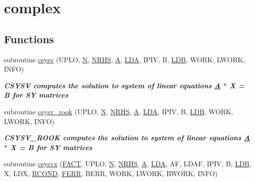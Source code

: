 \hypertarget{group__complexSYsolve}{}\section{complex}
\label{group__complexSYsolve}
\subsection*{Functions}
\begin{DoxyCompactItemize}
\item 
subroutine \hyperlink{group__complexSYsolve_ga7bfdf654eb5b41b318d5b8b3be55f575}{csysv} (U\+P\+L\+O, \hyperlink{polmisc_8c_a0240ac851181b84ac374872dc5434ee4}{N}, \hyperlink{example__user_8c_aa0138da002ce2a90360df2f521eb3198}{N\+R\+H\+S}, \hyperlink{classA}{A}, \hyperlink{example__user_8c_ae946da542ce0db94dced19b2ecefd1aa}{L\+D\+A}, I\+P\+I\+V, B, \hyperlink{example__user_8c_a50e90a7104df172b5a89a06c47fcca04}{L\+D\+B}, W\+O\+R\+K, L\+W\+O\+R\+K, I\+N\+F\+O)
\begin{DoxyCompactList}\small\item\em {\bfseries  C\+S\+Y\+S\+V computes the solution to system of linear equations \hyperlink{classA}{A} $\ast$ X = B for S\+Y matrices} \end{DoxyCompactList}\item 
subroutine \hyperlink{group__complexSYsolve_gaadb410c9b1f28931fe04501234603985}{csysv\+\_\+rook} (U\+P\+L\+O, \hyperlink{polmisc_8c_a0240ac851181b84ac374872dc5434ee4}{N}, \hyperlink{example__user_8c_aa0138da002ce2a90360df2f521eb3198}{N\+R\+H\+S}, \hyperlink{classA}{A}, \hyperlink{example__user_8c_ae946da542ce0db94dced19b2ecefd1aa}{L\+D\+A}, I\+P\+I\+V, B, \hyperlink{example__user_8c_a50e90a7104df172b5a89a06c47fcca04}{L\+D\+B}, W\+O\+R\+K, L\+W\+O\+R\+K, I\+N\+F\+O)
\begin{DoxyCompactList}\small\item\em {\bfseries  C\+S\+Y\+S\+V\+\_\+\+R\+O\+O\+K computes the solution to system of linear equations \hyperlink{classA}{A} $\ast$ X = B for S\+Y matrices} \end{DoxyCompactList}\item 
subroutine \hyperlink{group__complexSYsolve_gab83ef6fbaf99306b967bf9053a3e6082}{csysvx} (\hyperlink{superlu__enum__consts_8h_af00a42ecad444bbda75cde1b64bd7e72a1b6692b56d378abb85bd49063721d034}{F\+A\+C\+T}, U\+P\+L\+O, \hyperlink{polmisc_8c_a0240ac851181b84ac374872dc5434ee4}{N}, \hyperlink{example__user_8c_aa0138da002ce2a90360df2f521eb3198}{N\+R\+H\+S}, \hyperlink{classA}{A}, \hyperlink{example__user_8c_ae946da542ce0db94dced19b2ecefd1aa}{L\+D\+A}, A\+F, L\+D\+A\+F, I\+P\+I\+V, B, \hyperlink{example__user_8c_a50e90a7104df172b5a89a06c47fcca04}{L\+D\+B}, X, L\+D\+X, \hyperlink{superlu__enum__consts_8h_af00a42ecad444bbda75cde1b64bd7e72a9b5c151728d8512307565994c89919d5}{R\+C\+O\+N\+D}, \hyperlink{superlu__enum__consts_8h_af00a42ecad444bbda75cde1b64bd7e72a78fd14d7abebae04095cfbe02928f153}{F\+E\+R\+R}, B\+E\+R\+R, W\+O\+R\+K, L\+W\+O\+R\+K, R\+W\+O\+R\+K, I\+N\+F\+O)

\end{DoxyCompactItemize}
